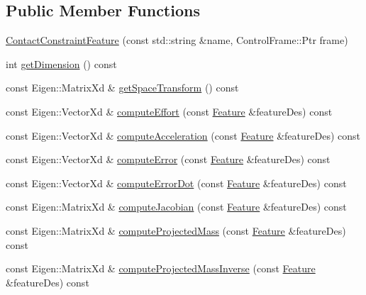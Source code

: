 \subsection*{Public Member Functions}
\begin{DoxyCompactItemize}
\item 
\hyperlink{classocra_1_1ContactConstraintFeature_a2e4c6265bd194309b5e2304260d53bec}{Contact\+Constraint\+Feature} (const std\+::string \&name, Control\+Frame\+::\+Ptr frame)
\item 
int \hyperlink{classocra_1_1ContactConstraintFeature_ac498096b8df524b054f35b05d027f0f0}{get\+Dimension} () const
\item 
const Eigen\+::\+Matrix\+Xd \& \hyperlink{classocra_1_1ContactConstraintFeature_ac7f34721e72544d13e7030182b55f429}{get\+Space\+Transform} () const
\item 
const Eigen\+::\+Vector\+Xd \& \hyperlink{classocra_1_1ContactConstraintFeature_ab545e20b58d45b47a0e2f2a0a64f9c48}{compute\+Effort} (const \hyperlink{classocra_1_1Feature}{Feature} \&feature\+Des) const
\item 
const Eigen\+::\+Vector\+Xd \& \hyperlink{classocra_1_1ContactConstraintFeature_a81aeb9d50b198c49d0868ba8321bcfd7}{compute\+Acceleration} (const \hyperlink{classocra_1_1Feature}{Feature} \&feature\+Des) const
\item 
const Eigen\+::\+Vector\+Xd \& \hyperlink{classocra_1_1ContactConstraintFeature_a2d5b3c766e22c541e416ca52d14e78df}{compute\+Error} (const \hyperlink{classocra_1_1Feature}{Feature} \&feature\+Des) const
\item 
const Eigen\+::\+Vector\+Xd \& \hyperlink{classocra_1_1ContactConstraintFeature_a0be2debba15230d160957c15eb5afa97}{compute\+Error\+Dot} (const \hyperlink{classocra_1_1Feature}{Feature} \&feature\+Des) const
\item 
const Eigen\+::\+Matrix\+Xd \& \hyperlink{classocra_1_1ContactConstraintFeature_a7b0fc26f03104eb02a7ba565b99a41d7}{compute\+Jacobian} (const \hyperlink{classocra_1_1Feature}{Feature} \&feature\+Des) const
\item 
const Eigen\+::\+Matrix\+Xd \& \hyperlink{classocra_1_1ContactConstraintFeature_ac4dec3a5defe2c50e6084d49a1838883}{compute\+Projected\+Mass} (const \hyperlink{classocra_1_1Feature}{Feature} \&feature\+Des) const
\item 
const Eigen\+::\+Matrix\+Xd \& \hyperlink{classocra_1_1ContactConstraintFeature_a9bdfabb746abff207ff9cc3e9c968c81}{compute\+Projected\+Mass\+Inverse} (const \hyperlink{classocra_1_1Feature}{Feature} \&feature\+Des) const

\end{DoxyCompactItemize}
